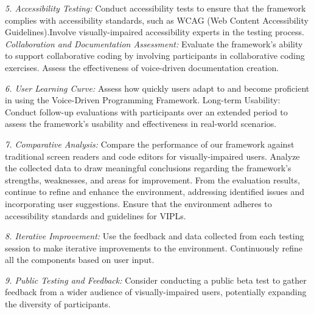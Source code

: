 {\em 5. Accessibility Testing:} Conduct accessibility tests to ensure
that the framework complies with accessibility standards, such as WCAG
(Web Content Accessibility Guidelines).Involve visually-impaired
accessibility experts in the testing process. {\em Collaboration and
  Documentation Assessment:} Evaluate the framework's ability to
support collaborative coding by involving participants in
collaborative coding exercises.  Assess the effectiveness of
voice-driven documentation creation.

{\em 6. User Learning Curve:} Assess how quickly users adapt to and
become proficient in using the Voice-Driven Programming
Framework. Long-term Usability: Conduct follow-up evaluations with
participants over an extended period to assess the framework's
usability and effectiveness in real-world scenarios.

{\em 7. Comparative Analysis:} Compare the performance of our
framework against traditional screen readers and code editors for
visually-impaired users. Analyze the collected data to draw meaningful
conclusions regarding the framework's strengths, weaknesses, and areas
for improvement.
From the evaluation results, continue to refine and enhance the
environment, addressing identified issues and incorporating user
suggestions.  Ensure that the environment adheres to accessibility
standards and guidelines for VIPLs.

{\em 8. Iterative Improvement:} Use the feedback and data collected
from each testing session to make iterative improvements to the
environment.  Continuously refine all the components
based on user input.

{\em 9. Public Testing and Feedback:} Consider conducting a public
beta test to gather feedback from a wider audience of
visually-impaired users, potentially expanding the diversity of
participants.




